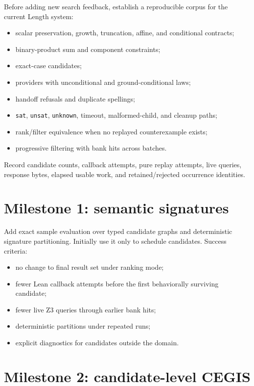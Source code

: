 \documentclass[10pt,letterpaper,oneside]{report}
\newcommand{\sat}{\texttt{sat}}
\newcommand{\unsat}{\texttt{unsat}}
\newcommand{\unknown}{\texttt{unknown}}
\begin{document}
Before adding new search feedback, establish a reproducible corpus for the current Length system:

\begin{itemize}
\item scalar preservation, growth, truncation, affine, and conditional contracts;
\item binary-product sum and component constraints;
\item exact-case candidates;
\item providers with unconditional and ground-conditional laws;
\item handoff refusals and duplicate spellings;
\item \sat, \unsat, \unknown, timeout, malformed-child, and cleanup paths;
\item rank/filter equivalence when no replayed counterexample exists;
\item progressive filtering with bank hits across batches.
\end{itemize}

Record candidate counts, callback attempts, pure replay attempts, live queries, response bytes, elapsed usable work, and retained/rejected occurrence identities.

\section{Milestone 1: semantic signatures}

Add exact sample evaluation over typed candidate graphs and deterministic signature partitioning. Initially use it only to schedule candidates. Success criteria:

\begin{itemize}
\item no change to final result set under ranking mode;
\item fewer Lean callback attempts before the first behaviorally surviving candidate;
\item fewer live Z3 queries through earlier bank hits;
\item deterministic partitions under repeated runs;
\item explicit diagnostics for candidates outside the domain.
\end{itemize}

\section{Milestone 2: candidate-level CEGIS}
\end{document}
